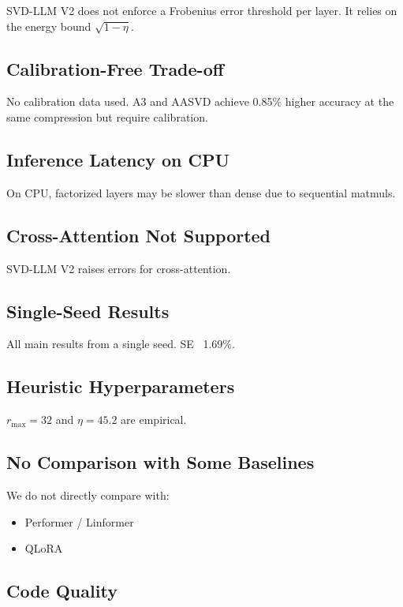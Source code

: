 SVD-LLM V2 does not enforce a Frobenius error threshold per layer. It relies 
on the energy bound $\sqrt{1 - \eta}$.

\subsection{Calibration-Free Trade-off}

No calibration data used. A3 and AASVD achieve 0.85\% higher accuracy 
at the same compression but require calibration.

\subsection{Inference Latency on CPU}

On CPU, factorized layers may be slower than dense due to sequential matmuls.

\subsection{Cross-Attention Not Supported}

SVD-LLM V2 raises errors for cross-attention.

\subsection{Single-Seed Results}

All main results from a single seed. SE ~1.69\%.

\subsection{Heuristic Hyperparameters}

$r_\text{max} = 32$ and $\eta = 45.2$ are empirical.

\subsection{No Comparison with Some Baselines}

We do not directly compare with:
\begin{itemize}
\item Performer / Linformer
\item QLoRA

\end{itemize}
\subsection{Code Quality}

